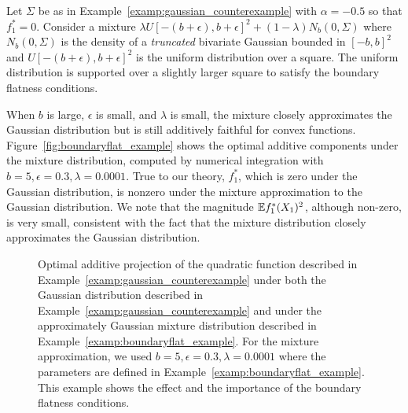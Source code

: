 \begin{example} 
\label{examp:boundaryflat_example}
Let $\Sigma$ be as in Example~\ref{examp:gaussian_counterexample} with $\alpha = -0.5$ so that $f^*_1 = 0$. Consider a mixture $\lambda U[-(b+\epsilon), b+\epsilon]^2 + (1-\lambda) N_b(0, \Sigma)$ where $N_b(0,\Sigma)$ is the density of a \emph{truncated} bivariate Gaussian bounded in $[-b, b]^2$ and $U[-(b+\epsilon), b+\epsilon]^2$ is the uniform distribution over a square. The uniform distribution is supported over a slightly larger square to satisfy the boundary flatness conditions.

When $b$ is large, $\epsilon$ is small, and $\lambda$ is small, the mixture closely approximates the Gaussian distribution but is still additively faithful for convex functions. Figure~\ref{fig:boundaryflat_example} shows the optimal additive components under the mixture distribution, computed by numerical integration with $b=5, \epsilon=0.3, \lambda=0.0001$. True to our theory, $f^*_1$, which is zero under the Gaussian distribution, is nonzero under the mixture approximation to the Gaussian distribution. We note that the magnitude ${\mathbb E} f^*_1(X_1)^2$, although non-zero, is very small, consistent with the fact that the mixture distribution closely approximates the Gaussian distribution.
\end{example}


\begin{figure}[htp]
\vskip-10pt
	\centering
\caption{Optimal additive projection of the quadratic function described in Example~\ref{examp:gaussian_counterexample} under both the Gaussian distribution described in Example~\ref{examp:gaussian_counterexample} and under the approximately Gaussian mixture distribution described in Example~\ref{examp:boundaryflat_example}. For the mixture approximation, we used $b=5, \epsilon=0.3, \lambda=0.0001$ where the parameters are defined in Example~\ref{examp:boundaryflat_example}. This example shows the effect and the importance of the boundary flatness conditions.}
\vskip-10pt
\end{figure}


